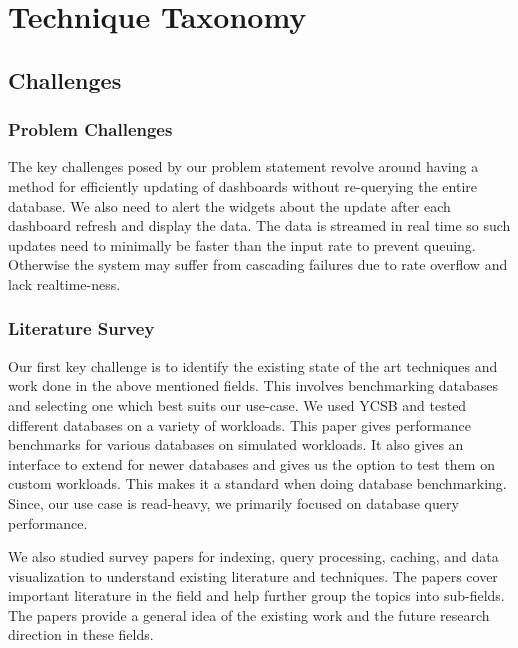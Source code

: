 \chapter{Technique Taxonomy} %


\section{Challenges}
\subsection{Problem Challenges}
The key challenges posed by our problem statement revolve around having a method for efficiently updating of dashboards without re-querying the entire database. We also need to alert the widgets about the update after each dashboard refresh and display the data. The data is streamed in real time so such updates need to minimally be faster than the input rate to prevent queuing. Otherwise the system may suffer from cascading failures due to rate overflow and lack realtime-ness.

\subsection{Literature Survey}
Our first key challenge is to identify the existing state of the art techniques and work done in the above mentioned fields. This involves benchmarking databases and selecting one which best suits our use-case. We used YCSB\cite{YCSB} and tested different databases on a variety of workloads. This paper gives performance benchmarks for various databases on simulated workloads. It also gives an interface to extend for newer databases and gives us the option to test them on custom workloads. This makes it a standard when doing database benchmarking. Since, our use case is read-heavy, we primarily focused on database query performance.

We also studied survey papers for indexing\cite{Indexing}, query processing\cite{QueryProcessing}, caching\cite{Caching}, and data visualization\cite{VisualizationTechniques} to understand existing literature and techniques. The papers cover important literature in the field and help further group the topics into sub-fields. The papers provide a general idea of the existing work and the future research direction in these fields.

